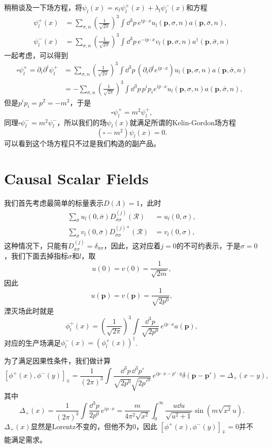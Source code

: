 \documentclass[9pt]{extbook}
\theoremstyle{plain}%
\begin{document}
稍稍谈及一下场方程，将$\psi_l(x)=\kappa_l\psi_l^+(x)+\lambda_l\psi_l^-(x)$和方程
\[
\begin{split}
	\psi_l^{+}(x)&=\sum_{\sigma,n}\left(\frac{1}{\sqrt{2\pi}}\right)^{3}\int \dd^3 p\, e^{ip\cdot x}u_{l}(\mathbf{p},\sigma,n)a(\mathbf{p},\bar{\sigma},n),\\
	\psi_l^{-}(x)&=\sum_{\sigma,n}\left(\frac{1}{\sqrt{2\pi}}\right)^{3}\int \dd^3 p\, e^{-ip\cdot x}v_{l}(\mathbf{p},\sigma,n)a^\dag(\mathbf{p},\bar{\sigma},n)
\end{split}
\]
一起考虑，可以得到
\[
\begin{split}
\square\psi_l^{+}=\partial_i\partial^i\psi_l^{+}&=\sum_{\sigma,n}\left(\frac{1}{\sqrt{2\pi}}\right)^{3}\int \dd^3 p\,(\partial_i\partial^i e^{ip\cdot x})u_{l}(\mathbf{p},\sigma,n)a(\mathbf{p},\bar{\sigma},n)\\
&=-\sum_{\sigma,n}\left(\frac{1}{\sqrt{2\pi}}\right)^{3}\int \dd^3 p\,p^ip_i e^{ip\cdot x}u_{l}(\mathbf{p},\sigma,n)a(\mathbf{p},\bar{\sigma},n),
\end{split}
\]
但是$p^ip_i=p^2=-m^2$，于是
\[
\square\psi_l^{+}=m^2\psi_l^{+},
\]
同理$\square\psi_l^{-}=m^2\psi_l^{-}$，所以我们的场$\psi_l(x)$就满足所谓的Kelin-Gordon场方程
\[
	(\square-m^2)\psi_l(x)=0.
\]
可以看到这个场方程只不过是我们构造的副产品。

\section{Causal Scalar Fields}
我们首先考虑最简单的标量表示$D(\Lambda)=1$，此时
\[
	\begin{split}
		\sum_{\bar{\sigma}}u_{l}(0,\bar{\sigma})D^{(j)}_{\bar{\sigma}\sigma}\left(\mathscr{R}\right)&=u_{l}(0,\sigma),\\
		\sum_{\bar{\sigma}}v_{l}(0,\bar{\sigma})D^{(j)*}_{\bar{\sigma}\sigma}\left(\mathscr{R}\right)&=v_{l}(0,\sigma),
	\end{split}
\]
这种情况下，只能有$D^{(j)}_{\bar{\sigma}\sigma}=\delta_{\bar{\sigma}\sigma}$，因此，这对应着$j=0$的不可约表示，于是$\sigma=0$，我们下面去掉指标$\sigma$和$l$，取
\[
	u(0)=v(0)=\frac{1}{\sqrt{2m}},
\]
因此
\[
	u(\mathbf{p})=v(\mathbf{p})=\frac{1}{\sqrt{2p^0}},
\]
湮灭场此时就是
\[
	\phi_l^{+}(x)=\left(\frac{1}{\sqrt{2\pi}}\right)^{3}\int \frac{\dd^3 p}{\sqrt{2p^0}}\, e^{ip\cdot x}a(\mathbf{p}),
\]
对应的生产场满足$\phi_l^{-}(x)=(\phi_l^{+}(x))^\dag$.

为了满足因果性条件，我们做计算
\[
	[\phi^{+}(x),\phi^{-}(y)]_{\mp}=\frac{1}{(2\pi)^{3}}\int\frac{\dd^3 p\,\dd^3 p'}{\sqrt{2p^0}\sqrt{2p'^0}}\,e^{ip\cdot x-p'\cdot y}\delta(\mathbf{p}-\mathbf{p'})=\Delta_+(x-y),
\]
其中
\[
\Delta_+(x)=\frac{1}{(2\pi)^{3}}\int\frac{\dd^3 p}{2p^0}\,e^{ip\cdot x}=\frac{m}{4\pi^2\sqrt{x^2}}\int_0^\infty\frac{u\dd u}{\sqrt{u^2+1}}\sin (m\sqrt{x^2} u).
\]
$\Delta_+(x)$显然是Lorentz不变的，但他不为0，因此
$[\phi^{+}(x),\phi^{-}(y)]_{\mp}=0$并不能满足需求。
\end{document}
